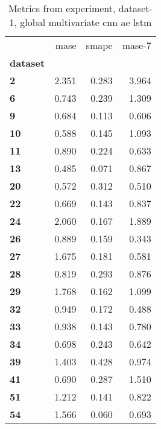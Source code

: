 \begin{table}[h]
\centering
\caption{Metrics from experiment, dataset-1, global multivariate cnn ae lstm}
\label{table:global-multivariate-cnn-ae-lstm-dataset-1}
\begin{tabular}{lrrr}
\toprule
{} &   mase &  smape &  mase-7 \\
\textbf{dataset} &        &        &         \\
\midrule
\textbf{2      } &  2.351 &  0.283 &   3.964 \\
\textbf{6      } &  0.743 &  0.239 &   1.309 \\
\textbf{9      } &  0.684 &  0.113 &   0.606 \\
\textbf{10     } &  0.588 &  0.145 &   1.093 \\
\textbf{11     } &  0.890 &  0.224 &   0.633 \\
\textbf{13     } &  0.485 &  0.071 &   0.867 \\
\textbf{20     } &  0.572 &  0.312 &   0.510 \\
\textbf{22     } &  0.669 &  0.143 &   0.837 \\
\textbf{24     } &  2.060 &  0.167 &   1.889 \\
\textbf{26     } &  0.889 &  0.159 &   0.343 \\
\textbf{27     } &  1.675 &  0.181 &   0.581 \\
\textbf{28     } &  0.819 &  0.293 &   0.876 \\
\textbf{29     } &  1.768 &  0.162 &   1.099 \\
\textbf{32     } &  0.949 &  0.172 &   0.488 \\
\textbf{33     } &  0.938 &  0.143 &   0.780 \\
\textbf{34     } &  0.698 &  0.243 &   0.642 \\
\textbf{39     } &  1.403 &  0.428 &   0.974 \\
\textbf{41     } &  0.690 &  0.287 &   1.510 \\
\textbf{51     } &  1.212 &  0.141 &   0.822 \\
\textbf{54     } &  1.566 &  0.060 &   0.693 \\
\bottomrule
\end{tabular}
\end{table}
